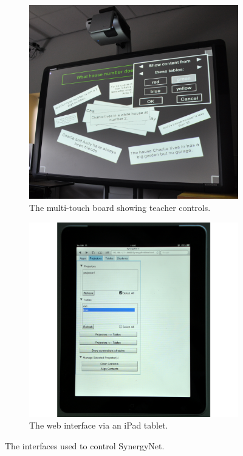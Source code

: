 \documentclass[link]{IWCOMP}
\begin{document}
\begin{figure}[h]
	\centering
	\begin{subfigure}[h]{0.23\textwidth}
		\centering
		\includegraphics[width=\textwidth]{figures/control_board.png}
		\caption{The multi-touch board showing teacher controls.}
		\label{fig:controlBoard}
	\end{subfigure}
	\begin{subfigure}[h]{0.23\textwidth}
		\centering
		\includegraphics[width=\textwidth]{figures/control_tablet.png}
		\caption{The web interface via an iPad tablet.}
		\label{fig:controlTablet}
	\end{subfigure}
   	\caption{The interfaces used to control SynergyNet.}
   	\label{fig:controlDevices}
\end{figure} 
\end{document}
